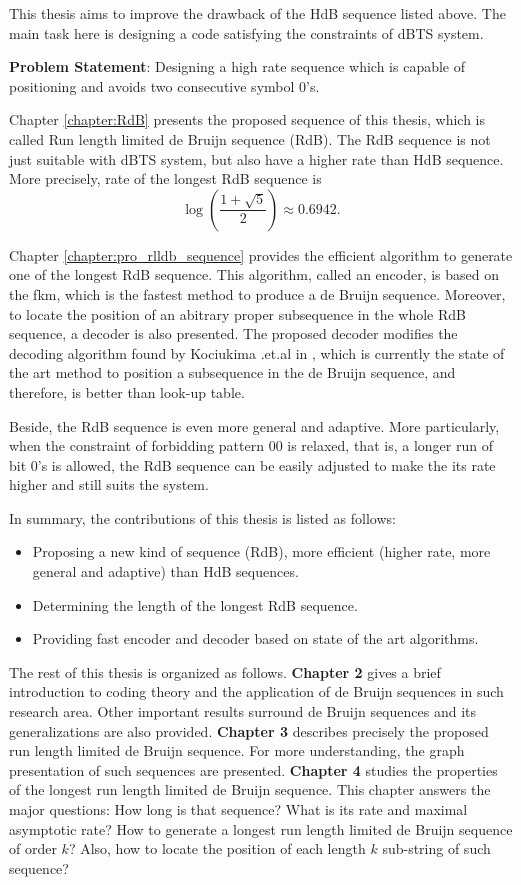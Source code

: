This thesis aims to improve the drawback of the \gls{HdB} sequence listed above. The main task here is designing a code satisfying the constraints of \gls{dBTS} system.

\textbf{Problem Statement}: Designing a high rate sequence which is capable of positioning and avoids two consecutive symbol $0$'s.

Chapter \ref{chapter:RdB} presents the proposed sequence of this thesis, which is called Run length limited de Bruijn sequence (\gls{RdB}). The \gls{RdB} sequence is not just suitable with \gls{dBTS} system, but also have a higher rate than \gls{HdB} sequence. More precisely, rate of the longest \gls{RdB} sequence is \[\log\left(\dfrac{1+\sqrt{5}}{2}\right)\approx0.6942.\]

Chapter \ref{chapter:pro_rlldb_sequence} provides the efficient algorithm to generate one of the longest \gls{RdB} sequence. This algorithm, called an encoder, is based on the \gls{fkm}, which is the fastest method to produce a de Bruijn sequence. Moreover, to locate the position of an abitrary proper subsequence in the whole \gls{RdB} sequence, a decoder is also presented. The proposed decoder modifies the decoding algorithm found by Kociukima .et.al in \cite{kociumaka2016efficient}, which is currently the state of the art method to position a subsequence in the de Bruijn sequence, and therefore, is better than look-up table.

Beside, the \gls{RdB} sequence is even more general and adaptive. More particularly, when the constraint of forbidding pattern $00$ is relaxed, that is, a longer run of bit $0$'s is allowed, the \gls{RdB} sequence can be easily adjusted to make the its rate higher and still suits the system. 

In summary, the contributions of this thesis is listed as follows:
\begin{itemize}
    \item Proposing a new kind of sequence (\gls{RdB}), more efficient (higher rate, more general and adaptive) than \gls{HdB} sequences.
    \item Determining the length of the longest \gls{RdB} sequence.
    \item Providing fast encoder and decoder based on state of the art algorithms.
\end{itemize}

The rest of this thesis is organized as follows. \textbf{Chapter 2} gives a brief introduction to coding theory and the application of de Bruijn sequences in such research area. Other important results surround de Bruijn sequences and its generalizations are also provided.     \textbf{Chapter 3} describes precisely the proposed run length limited de Bruijn sequence. For more understanding, the graph presentation of such sequences are presented. \textbf{Chapter 4} studies the properties of the longest run length limited de Bruijn sequence. This chapter answers the major questions: How long is that sequence? What is its rate and maximal asymptotic rate? How to generate a longest run length limited de Bruijn sequence of order $k$? Also, how to locate the position of each length $k$ sub-string of such sequence?